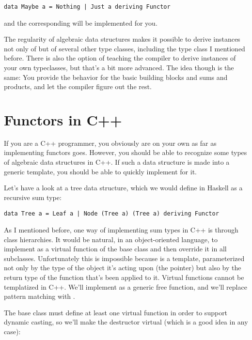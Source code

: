 \begin{verbatim}
data Maybe a = Nothing | Just a deriving Functor
\end{verbatim}

and the corresponding  will be implemented for you.

The regularity of algebraic data structures makes it possible to derive
instances not only of  but of several other type
classes, including the  type class I mentioned before. There
is also the option of teaching the compiler to derive instances of your
own typeclasses, but that's a bit more advanced. The idea though is the
same: You provide the behavior for the basic building blocks and sums
and products, and let the compiler figure out the rest.

\section{Functors in C++}\label{functors-in-c}

If you are a C++ programmer, you obviously are on your own as far as
implementing functors goes. However, you should be able to recognize
some types of algebraic data structures in C++. If such a data structure
is made into a generic template, you should be able to quickly implement
 for it.

Let's have a look at a tree data structure, which we would define in
Haskell as a recursive sum type:

\begin{verbatim}
data Tree a = Leaf a | Node (Tree a) (Tree a) deriving Functor
\end{verbatim}

As I mentioned before, one way of implementing sum types in C++ is
through class hierarchies. It would be natural, in an object-oriented
language, to implement  as a virtual function of the base
class  and then override it in all subclasses.
Unfortunately this is impossible because  is a template,
parameterized not only by the type of the object it's acting upon (the
 pointer) but also by the return type of the function
that's been applied to it. Virtual functions cannot be templatized in
C++. We'll implement  as a generic free function, and we'll
replace pattern matching with .

The base class must define at least one virtual function in order to
support dynamic casting, so we'll make the destructor virtual (which is
a good idea in any case):

